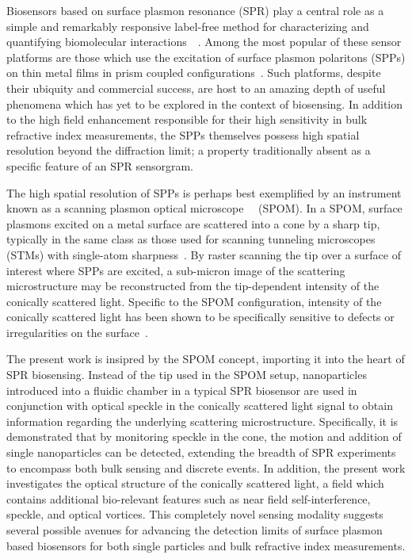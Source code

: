 Biosensors based on surface plasmon resonance (SPR) play a central role as a
simple and remarkably responsive label-free method for characterizing and
quantifying biomolecular
interactions~\cite{homola1999surface}~\cite{homola2006surface}.  Among the
most popular of these sensor platforms are those which use the excitation of
surface plasmon polaritons (SPPs) on thin metal films in prism coupled
configurations~\cite{hoa2007towards}.  Such platforms, despite their ubiquity
and commercial success, are host to an amazing depth of useful phenomena which
has yet to be explored in the context of biosensing.  In addition to the high
field enhancement responsible for their high sensitivity in bulk refractive
index measurements, the SPPs themselves possess high spatial resolution beyond
the diffraction limit; a property traditionally absent as a specific feature
of an SPR sensorgram.  

The high spatial resolution of SPPs is perhaps best exemplified by an
instrument known as a scanning plasmon optical
microscope~\cite{kim1995scanning}~\cite{kim1996scanning} (SPOM).  In a SPOM,
surface plasmons excited on a metal surface are scattered into a cone by a
sharp tip, typically in the same class as those used for scanning tunneling
microscopes (STMs) with single-atom sharpness~\cite{binnig2000scanning}.  By
raster scanning the tip over a surface of interest where SPPs are excited, a
sub-micron image of the scattering microstructure may be reconstructed from
the tip-dependent intensity of the conically scattered light.  Specific to the
SPOM configuration, intensity of the conically scattered light has been shown
to be specifically sensitive to defects or irregularities on the
surface~\cite{kim1996scanning}.  

The present work is insipred by the SPOM concept, importing it into the heart
of SPR biosensing.  Instead of the tip used in the SPOM setup, nanoparticles
introduced into a fluidic chamber in a typical SPR biosensor are used in
conjunction with optical speckle in the conically scattered light signal to
obtain information regarding the underlying scattering microstructure.
Specifically, it is demonstrated that by monitoring speckle in the cone, the
motion and addition of single nanoparticles can be detected, extending the
breadth of SPR experiments to encompass both bulk sensing and discrete events.
In addition, the present work investigates the optical structure of the
conically scattered light, a field which contains additional bio-relevant
features such as near field self-interference, speckle, and optical vortices.
This completely novel sensing modality suggests several possible avenues for
advancing the detection limits of surface plasmon based biosensors for both
single particles and bulk refractive index measurements.
